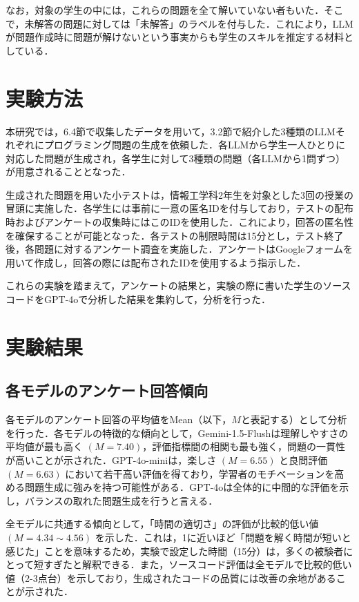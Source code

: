 \documentclass[11pt]{jreport}
\begin{document}
なお，対象の学生の中には，これらの問題を全て解いていない者もいた．そこで，未解答の問題に対しては「未解答」のラベルを付与した．これにより，LLMが問題作成時に問題が解けないという事実からも学生のスキルを推定する材料としている．

\section{実験方法}
本研究では，6.4節で収集したデータを用いて，3.2節で紹介した3種類のLLMそれぞれにプログラミング問題の生成を依頼した．各LLMから学生一人ひとりに対応した問題が生成され，各学生に対して3種類の問題（各LLMから1問ずつ）が用意されることとなった．

生成された問題を用いた小テストは，情報工学科2年生を対象とした3回の授業の冒頭に実施した．各学生には事前に一意の匿名IDを付与しており，テストの配布時およびアンケートの収集時にはこのIDを使用した．これにより，回答の匿名性を確保することが可能となった．各テストの制限時間は15分とし，テスト終了後，各問題に対するアンケート調査を実施した．アンケートはGoogleフォームを用いて作成し，回答の際には配布されたIDを使用するよう指示した．

これらの実験を踏まえて，アンケートの結果と，実験の際に書いた学生のソースコードをGPT-4oで分析した結果を集約して，分析を行った．
\section{実験結果}

\subsection{各モデルのアンケート回答傾向}
各モデルのアンケート回答の平均値をMean（以下，$M$と表記する）として分析を行った．各モデルの特徴的な傾向として，Gemini-1.5-Flushは理解しやすさの平均値が最も高く $(M=7.40)$，評価指標間の相関も最も強く，問題の一貫性が高いことが示された．GPT-4o-miniは，楽しさ $(M=6.55)$ と良問評価 $(M=6.63)$ において若干高い評価を得ており，学習者のモチベーションを高める問題生成に強みを持つ可能性がある．GPT-4oは全体的に中間的な評価を示し，バランスの取れた問題生成を行うと言える．

全モデルに共通する傾向として，「時間の適切さ」の評価が比較的低い値 $(M=4.34\sim4.56)$ を示した．これは，1に近いほど「問題を解く時間が短いと感じた」ことを意味するため，実験で設定した時間（15分）は，多くの被験者にとって短すぎたと解釈できる．また，ソースコード評価は全モデルで比較的低い値（2-3点台）を示しており，生成されたコードの品質には改善の余地があることが示された．
\end{document}
